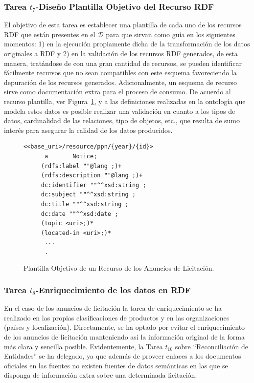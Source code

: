 \subsubsection{Tarea $t_7$-Diseño Plantilla Objetivo del Recurso RDF}
El objetivo de esta tarea es establecer una plantilla de cada uno de los recursos RDF que están 
presentes en el \dataset $\mathcal{D}$ para que sirvan como guía en los siguientes momentos: 1) en la ejecución propiamente dicha 
de la transformación de los datos originales a \gls{RDF} y 2) en la validación de los recursos RDF generados, de esta manera, 
tratándose de \datasets con una gran cantidad de recursos, se pueden identificar fácilmente recursos que no sean 
compatibles con este esquema favoreciendo la depuración de los recursos generados. Adicionalmente, un esquema de 
recurso sirve como documentación extra para el proceso de consumo. 
%
De acuerdo al recurso plantilla, ver Figura~\ref{fig:ppn-template}, y a las definiciones realizadas en la ontología que modela estos datos 
es posible realizar una validación en cuanto a los tipos de datos, cardinalidad de las relaciones, tipo de objetos, etc., que 
resulta de sumo interés para asegurar la calidad de los datos producidos.
 
 \begin{figure}[!htp]
 \begin{lstlisting} 
<<base_uri>/resource/ppn/{year}/{id}>
      a       Notice;
     (rdfs:label ""@lang ;)+
     (rdfs:description ""@lang ;)+
     dc:identifier ""^^xsd:string ;
     dc:subject ""^^xsd:string ;
     dc:title ""^^xsd:string ;
     dc:date ""^^xsd:date ;
     (topic <uri>;)*
     (located-in <uri>;)*
      ...
      .	
\end{lstlisting}
	\caption{Plantilla Objetivo de un Recurso de los Anuncios de Licitación.}
	\label{fig:ppn-template}
\end{figure}
% 
% 
% 
\subsubsection{Tarea $t_8$-Enriquecimiento de los datos en RDF}\label{t8-pscs}
En el caso de los anuncios de licitación la tarea de enriquecimiento se ha realizado 
en las propias clasificaciones de productos y en las organizaciones (países y localización). Directamente, 
se ha optado por evitar el enriquecimiento de los anuncios de licitación manteniendo así la información 
original de la forma más clara y sencilla posible. Evidentemente, la Tarea $t_{10}$ sobre ``Reconciliación de Entidades'' 
se ha delegado, ya que además de proveer enlaces a los documentos oficiales en las fuentes no existen fuentes 
de datos semánticas en las que se disponga de información extra sobre una determinada licitación.
% 
